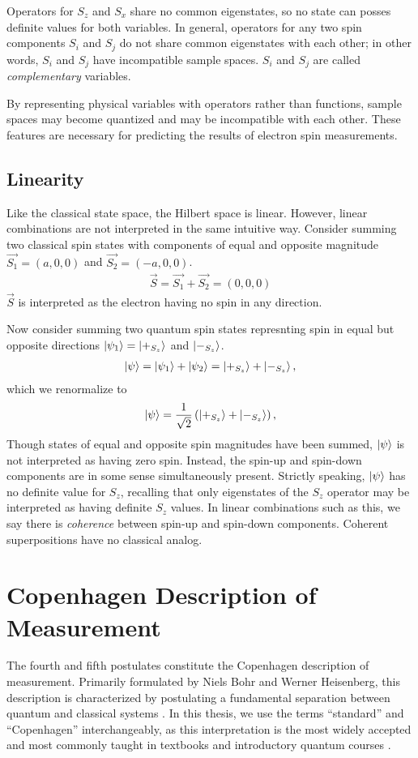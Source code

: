 Operators for $S_z$ and $S_x$ share no common eigenstates, so no state can posses definite values for both variables. In general, operators for any two spin components $S_i$ and $S_j$ do not share common eigenstates with each other; in other words, $S_i$ and $S_j$ have incompatible sample spaces. $S_i$ and $S_j$ are called \textit{complementary} variables.

By representing physical variables with operators rather than functions, sample spaces may become quantized and may be incompatible with each other. These features are necessary for predicting the results of electron spin measurements.

\subsection{Linearity}
Like the classical state space, the Hilbert space is linear. However, linear combinations are not interpreted in the same intuitive way. Consider summing two classical spin states with components of equal and opposite magnitude $\vec{S_1} = (a, 0, 0)$ and $\vec{S_2} = (-a, 0, 0)$.
\begin{align}
  \vec{S} = \vec{S_1} + \vec{S_2} = (0, 0, 0)
\end{align}
$\vec{S}$ is interpreted as the electron having no spin in any direction.

Now consider summing two quantum spin states represnting spin in equal but opposite directions $\ket{\psi_1} = \ket{+_{S_z}}$ and $\ket{-_{S_z}}$.
\begin{align}
  \ket{\psi} = \ket{\psi_1} + \ket{\psi_2} = \ket{+_{S_z}} + \ket{-_{S_z}},
\end{align}
which we renormalize to
\begin{align}
  \ket{\psi} = \frac{1}{\sqrt{2}} \left(\ket{+_{S_z}} + \ket{-_{S_z}} \right),
\end{align}
Though states of equal and opposite spin magnitudes have been summed, $\ket{\psi}$ is not interpreted as having zero spin. Instead, the spin-up and spin-down components are in some sense simultaneously present. Strictly speaking, $\ket{\psi}$ has no definite value for $S_z$, recalling that only eigenstates of the $S_z$ operator may be interpreted as having definite $S_z$ values. In linear combinations such as this, we say there is \textit{coherence} between spin-up and spin-down components. Coherent superpositions have no classical analog.

\section{Copenhagen Description of Measurement}
The fourth and fifth postulates constitute the Copenhagen description of measurement. Primarily formulated by Niels Bohr and Werner Heisenberg, this description is characterized by postulating a fundamental separation between quantum and classical systems \cite{Schlosshauer}. In this thesis, we use the terms ``standard'' and ``Copenhagen'' interchangeably, as this interpretation is the most widely accepted and most commonly taught in textbooks and introductory quantum courses \cite{siddiqui}.

